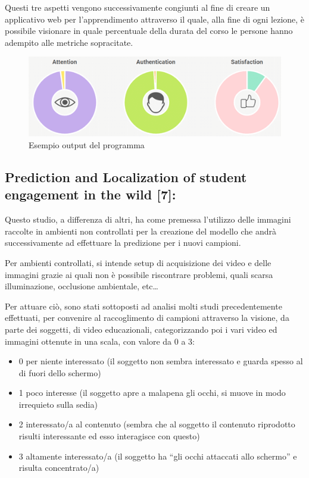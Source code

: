 Questi tre aspetti vengono successivamente congiunti al fine di creare un applicativo web per l’apprendimento attraverso il quale, alla fine di ogni lezione, è possibile visionare in quale percentuale della durata del corso le persone hanno adempito alle metriche sopracitate.

\begin{figure}
    \begin{center}    
        \includegraphics[width=1\linewidth]{images/3.png}
        \caption{Esempio output del programma}
    \end{center}
\end{figure}
 
\subsection{Prediction and Localization of student engagement in the wild [7]:}

Questo studio, a differenza di altri, ha come premessa l’utilizzo delle immagini raccolte in ambienti non controllati per la creazione del modello che andrà successivamente ad effettuare la predizione per i nuovi campioni.

Per ambienti controllati, si intende setup di acquisizione dei video e delle immagini grazie ai quali non è possibile riscontrare problemi, quali scarsa illuminazione, occlusione ambientale, etc…

Per attuare ciò, sono stati sottoposti ad analisi molti studi precedentemente effettuati, per convenire al raccoglimento di campioni attraverso la visione, da parte dei soggetti, di video educazionali, categorizzando poi i vari video ed immagini ottenute in una scala, con valore da 0 a 3:
\begin{itemize}
    \item 0 \textrightarrow per niente interessato (il soggetto non sembra interessato e guarda spesso al di fuori dello schermo)
    \item 1 \textrightarrow poco interesse (il soggetto apre a malapena gli occhi, si muove in modo irrequieto sulla sedia)
    \item 2 \textrightarrow interessato/a al contenuto (sembra che al soggetto il contenuto riprodotto risulti interessante ed esso interagisce con questo)
    \item 3 \textrightarrow altamente interessato/a (il soggetto ha “gli occhi attaccati allo schermo” e risulta concentrato/a)
\end{itemize}


